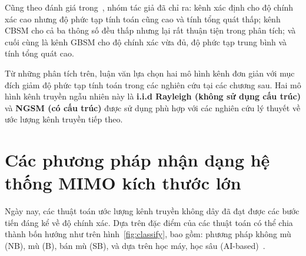 Cũng theo đánh giá trong~\cite{Feng2022}, nhóm tác giả đã chỉ ra: kênh xác định cho độ chính xác cao nhưng độ phức tạp tính toán cũng cao và tính tổng quát thấp; kênh CBSM cho cả ba thông số đều thấp nhưng lại rất thuận tiện trong phân tích; và cuối cùng là kênh GBSM cho độ chính xác vừa đủ, độ phức tạp trung bình và tính tổng quát cao.

Từ những phân tích trên, luận văn lựa chọn hai mô hình kênh đơn giản với mục đích giảm độ phức tạp tính toán trong các nghiên cứu tại các chương sau. Hai mô hình kênh truyền ngẫu nhiên này là \textbf{i.i.d Rayleigh (không sử dụng cấu trúc)} và \textbf{NGSM (có cấu trúc)} được sử dụng phù hợp với các nghiên cứu lý thuyết về ước lượng kênh truyền tiếp theo.

\section{Các phương pháp nhận dạng hệ thống MIMO kích thước lớn}

Ngày nay, các thuật toán ước lượng kênh truyền không dây đã đạt được các bước tiến đáng kể về độ chính xác. Dựa trên đặc điểm của các thuật toán có thể chia thành bốn hướng như trên hình~\ref{fig:classify}, bao gồm: phương pháp không mù (NB), mù (B), bán mù (SB), và dựa trên học máy, học sâu (AI-based)~\cite{vilas2022}. 

